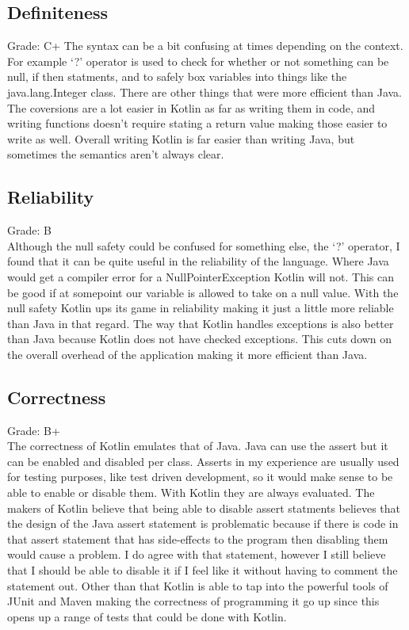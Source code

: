 \subsection{Definiteness}
Grade: C+
The syntax can be a bit confusing at times depending on the context. For example `?' operator is used to check for whether or not something can be null, if then statments, and to safely box variables into things like the java.lang.Integer class. There are other things that were more efficient than Java. The coversions are a lot easier in Kotlin as far as writing them in code, and writing functions doesn't require stating a return value making those easier to write as well. Overall writing Kotlin is far easier than writing Java, but sometimes the semantics aren't always clear. 

\subsection{Reliability}
Grade: B
\\
Although the null safety could be confused for something else, the `?' operator, I found that it can be quite useful in the reliability of the language. Where Java would get a compiler error for a NullPointerException Kotlin will not. This can be good if at somepoint our variable is allowed to take on a null value. With the null safety Kotlin ups its game in reliability making it just a little more reliable than Java in that regard. The way that Kotlin handles exceptions is also better than Java because Kotlin does not have checked exceptions. This cuts down on the overall overhead of the application making it more efficient than Java.  

\subsection{Correctness}
Grade: B+
\\
The correctness of Kotlin emulates that of Java. Java can use the assert but it can be enabled and disabled per class. Asserts in my experience are usually used for testing purposes, like test driven development, so it would make sense to be able to enable or disable them. With Kotlin they are always evaluated. The makers of Kotlin believe that being able to disable assert statments believes that the design of the Java assert statement is problematic because if there is code in that assert statement that has side-effects to the program then disabling them would cause a problem. I do agree with that statement, however I still believe that I should be able to disable it if I feel like it without having to comment the statement out. Other than that Kotlin is able to tap into the powerful tools of JUnit and Maven making the correctness of programming it go up since this opens up a range of tests that could be done with Kotlin.


